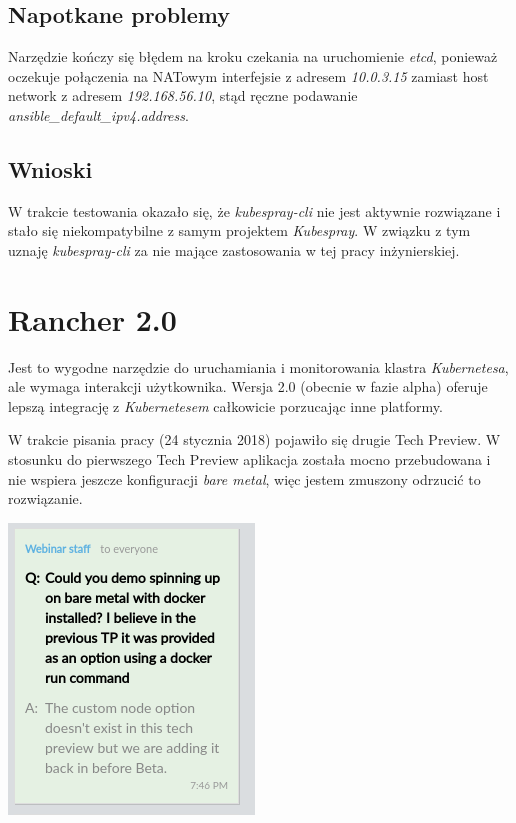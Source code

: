 \documentclass[a4paper,12pt,twoside,openany]{report}
\begin{document}
\hypertarget{napotkane-problemy}{%
\subsection{Napotkane problemy}\label{napotkane-problemy}}

Narzędzie kończy się błędem na kroku czekania na uruchomienie
\emph{etcd}, ponieważ oczekuje połączenia na NATowym interfejsie z
adresem \emph{10.0.3.15} zamiast host network z adresem
\emph{192.168.56.10}, stąd ręczne podawanie
\emph{ansible\_default\_ipv4.address}.

\hypertarget{wnioski-1}{%
\subsection{Wnioski}\label{wnioski-1}}

W trakcie testowania okazało się, że \emph{kubespray-cli} nie jest
aktywnie rozwiązane i stało się niekompatybilne z samym projektem
\emph{Kubespray}. W związku z tym uznaję \emph{kubespray-cli} za nie
mające zastosowania w tej pracy inżynierskiej.

\hypertarget{rancher-kubernetes}{%
\section{Rancher 2.0}\label{rancher-kubernetes}}

Jest to wygodne narzędzie do uruchamiania i monitorowania klastra
\emph{Kubernetesa}, ale wymaga interakcji użytkownika. Wersja 2.0
(obecnie w fazie alpha) oferuje lepszą integrację z \emph{Kubernetesem}
całkowicie porzucając inne platformy.

W trakcie pisania pracy (24 stycznia 2018) pojawiło się drugie Tech
Preview. W stosunku do pierwszego Tech Preview aplikacja została mocno
przebudowana i nie wspiera jeszcze konfiguracji \emph{bare metal}, więc
jestem zmuszony odrzucić to rozwiązanie.

\includegraphics{assets/rancher-tp2-baremetal.png}\\
\end{document}
